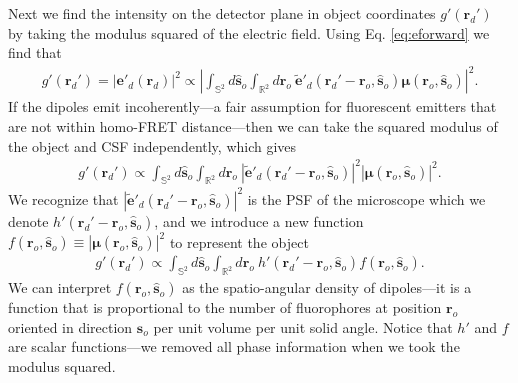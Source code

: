 \documentclass[11pt]{article}
\providecommand{\mb}[1]{\mathbf{#1}}
\providecommand{\ro}[1]{\mathbf{\mathbf{r}}_o}
\providecommand{\so}[1]{\mathbf{\hat{s}}_o}
\providecommand{\rd}[1]{\mathbf{r}_d}
\providecommand{\bs}[1]{\boldsymbol{#1}}
\begin{document}
Next we find the intensity on the detector plane in object coordinates
$g'(\rd{}')$ by taking the modulus squared of the electric field. Using Eq.
\ref{eq:eforward} we find that
\begin{align}
  g'(\rd{}') = |\mb{e}'_d(\rd{})|^2 \propto \left|\int_{\mathbb{S}^2}d\so{}\int_{\mathbb{R}^2}d\ro{} \ \tilde{\mb{e}}'_d(\rd{}' - \mb{r}_o, \so{})\bs{\mu}(\ro{}, \so{})\right|^2. 
\end{align}
If the dipoles emit incoherently---a fair assumption for fluorescent emitters
that are not within homo-FRET distance---then we can take the squared modulus of the
object and CSF independently, which gives
\begin{align}
  g'(\rd{}') \propto \int_{\mathbb{S}^2}d\so{}\int_{\mathbb{R}^2}d\ro{} \ \left|\tilde{\mb{e}}'_d(\rd{}' - \mb{r}_o, \so{})\right|^2\left|\bs{\mu}(\ro{}, \so{})\right|^2. 
\end{align}
We recognize that $\left|\tilde{\mb{e}}'_d(\rd{}' - \mb{r}_o, \so{})\right|^2$ is
the PSF of the microscope which we denote $h'(\rd{}' - \mb{r}_o, \so{})$, and
we introduce a new function
$f(\ro{}, \so{}) \equiv \left|\bs{\mu}(\ro{}, \so{})\right|^2$ to represent the object
\begin{align}
  g'(\rd{}') \propto \int_{\mathbb{S}^2}d\so{}\int_{\mathbb{R}^2}d\ro{} \ h'(\rd{}' - \mb{r}_o, \so{})f(\ro{}, \so{}).\label{eq:forwardint}
\end{align}
We can interpret $f(\ro{}, \so{})$ as the spatio-angular density of dipoles---it
is a function that is proportional to the number of fluorophores at position
$\ro{}$ oriented in direction $\so{}$ per unit volume per unit solid angle. Notice
that $h'$ and $f$ are scalar functions---we removed all phase information when we took
the modulus squared. 
\end{document}
